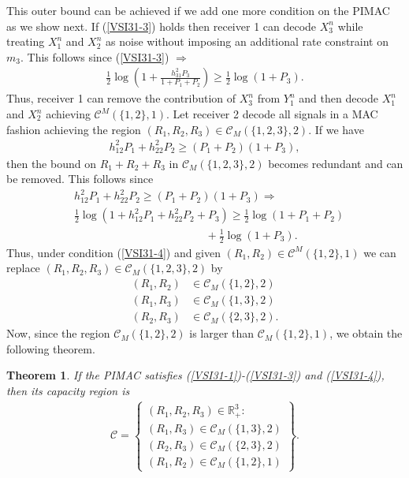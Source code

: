 \documentclass[10pt,conference]{IEEEtran}
\newtheorem{theorem}{Theorem}
\begin{document}
This outer bound can be achieved if we add one more condition on the PIMAC as we show next. If (\ref{VSI31-3}) holds then receiver 1 can decode $X_3^n$ while treating $X_1^n$ and $X_2^n$ as noise without imposing an additional rate constraint on $m_3$. This follows since (\ref{VSI31-3}) $\Rightarrow$
\begin{align}
\frac{1}{2}\log\left(1+\frac{h_{31}^2P_3}{1+P_1+P_2}\right)\geq\frac{1}{2}\log(1+P_3).
\end{align}
Thus, receiver 1 can remove the contribution of $X_3^n$ from $Y_1^n$ and then decode $X_1^n$ and $X_2^n$ achieving $\mathcal{C}^M(\{1,2\},1)$. Let receiver 2 decode all signals in a MAC fashion achieving the region $(R_1,R_2,R_3)\in\mathcal{C}_M(\{1,2,3\},2)$. If we have
\begin{align}
\label{VSI31-4}
h_{12}^2P_1+h_{22}^2P_2\geq(P_1+P_2)(1+P_3),
\end{align}
then the bound on $R_1+R_2+R_3$ in $\mathcal{C}_M(\{1,2,3\},2)$ becomes redundant and can be removed. This follows since
\begin{align}
&h_{12}^2P_1+h_{22}^2P_2\geq(P_1+P_2)(1+P_3)\Rightarrow\\
&\frac{1}{2}\log(1+h_{12}^2P_1+h_{22}^2P_2+P_3)\geq\frac{1}{2}\log(1+P_1+P_2)\nonumber\\
&\hspace{5cm}+\frac{1}{2}\log(1+P_3).
\end{align}
Thus, under condition (\ref{VSI31-4}) and given $(R_1,R_2)\in\mathcal{C}^M(\{1,2\},1)$ we can replace $(R_1,R_2,R_3)\in\mathcal{C}_M(\{1,2,3\},2)$ by 
\begin{align}
(R_1,R_2)&\in\mathcal{C}_M(\{1,2\},2)\\
(R_1,R_3)&\in\mathcal{C}_M(\{1,3\},2)\\
(R_2,R_3)&\in\mathcal{C}_M(\{2,3\},2).
\end{align}
Now, since the region $\mathcal{C}_M(\{1,2\},2)$ is larger than $\mathcal{C}_M(\{1,2\},1)$, we obtain the following theorem.
\begin{theorem}
If the PIMAC satisfies (\ref{VSI31-1})-(\ref{VSI31-3}) and (\ref{VSI31-4}), then its capacity region is
\begin{align}
\mathcal{C}=\left\{
\begin{array}{l}
(R_1,R_2,R_3)\in\mathbb{R}_+^3:\\
(R_1,R_3)\in\mathcal{C}_M(\{1,3\},2)\\
(R_2,R_3)\in\mathcal{C}_M(\{2,3\},2)\\
(R_1,R_2)\in\mathcal{C}_M(\{1,2\},1)
\end{array}\right\}.
\end{align} 
\end{theorem}
\end{document}
